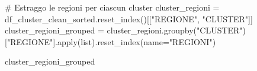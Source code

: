 \documentclass[
  letterpaper,
  DIV=11,
  numbers=noendperiod]{scrartcl}
\newenvironment{Shaded}{\begin{snugshade}}{\end{snugshade}}
\newcommand{\BuiltInTok}[1]{\textcolor[rgb]{0.00,0.23,0.31}{#1}}
\newcommand{\CommentTok}[1]{\textcolor[rgb]{0.37,0.37,0.37}{#1}}
\newcommand{\NormalTok}[1]{\textcolor[rgb]{0.00,0.23,0.31}{#1}}
\newcommand{\OperatorTok}[1]{\textcolor[rgb]{0.37,0.37,0.37}{#1}}
\newcommand{\StringTok}[1]{\textcolor[rgb]{0.13,0.47,0.30}{#1}}
\begin{document}
\begin{Shaded}
\begin{Highlighting}[]
\CommentTok{\# Estraggo le regioni per ciascun cluster}
\NormalTok{cluster\_regioni }\OperatorTok{=}\NormalTok{ df\_cluster\_clean\_sorted.reset\_index()[[}\StringTok{"REGIONE"}\NormalTok{, }\StringTok{"CLUSTER"}\NormalTok{]]}
\NormalTok{cluster\_regioni\_grouped }\OperatorTok{=}\NormalTok{ cluster\_regioni.groupby(}\StringTok{"CLUSTER"}\NormalTok{)[}\StringTok{"REGIONE"}\NormalTok{].}\BuiltInTok{apply}\NormalTok{(}\BuiltInTok{list}\NormalTok{).reset\_index(name}\OperatorTok{=}\StringTok{"REGIONI"}\NormalTok{)}

\NormalTok{cluster\_regioni\_grouped}
\end{Highlighting}
\end{Shaded}
\end{document}
